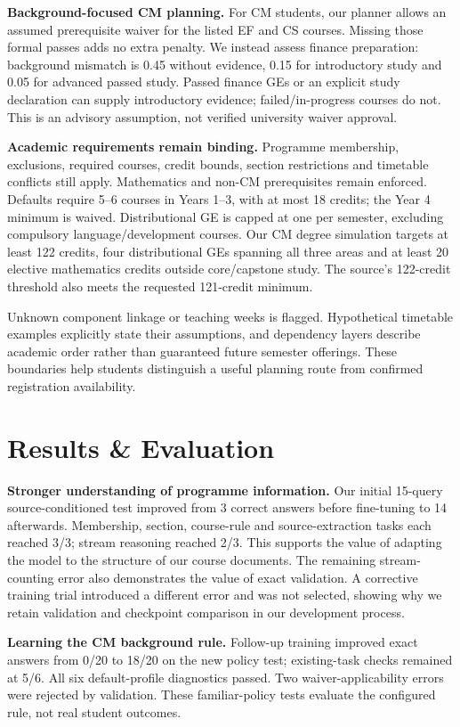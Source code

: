 \documentclass{article}
\begin{document}
\textbf{Background-focused CM planning.} For CM students, our planner allows an assumed prerequisite waiver for the listed EF and CS courses. Missing those formal passes adds no extra penalty. We instead assess finance preparation: background mismatch is 0.45 without evidence, 0.15 for introductory study and 0.05 for advanced passed study. Passed finance GEs or an explicit study declaration can supply introductory evidence; failed/in-progress courses do not. This is an advisory assumption, not verified university waiver approval.

\textbf{Academic requirements remain binding.} Programme membership, exclusions, required courses, credit bounds, section restrictions and timetable conflicts still apply. Mathematics and non-CM prerequisites remain enforced. Defaults require 5--6 courses in Years 1--3, with at most 18 credits; the Year 4 minimum is waived. Distributional GE is capped at one per semester, excluding compulsory language/development courses. Our CM degree simulation targets at least 122 credits, four distributional GEs spanning all three areas and at least 20 elective mathematics credits outside core/capstone study. The source's 122-credit threshold also meets the requested 121-credit minimum.

Unknown component linkage or teaching weeks is flagged. Hypothetical timetable examples explicitly state their assumptions, and dependency layers describe academic order rather than guaranteed future semester offerings. These boundaries help students distinguish a useful planning route from confirmed registration availability.

\newpage
\section{Results \& Evaluation}
\textbf{Stronger understanding of programme information.} Our initial 15-query source-conditioned test improved from 3 correct answers before fine-tuning to 14 afterwards. Membership, section, course-rule and source-extraction tasks each reached 3/3; stream reasoning reached 2/3. This supports the value of adapting the model to the structure of our course documents. The remaining stream-counting error also demonstrates the value of exact validation. A corrective training trial introduced a different error and was not selected, showing why we retain validation and checkpoint comparison in our development process.

\textbf{Learning the CM background rule.} Follow-up training improved exact answers from 0/20 to 18/20 on the new policy test; existing-task checks remained at 5/6. All six default-profile diagnostics passed. Two waiver-applicability errors were rejected by validation. These familiar-policy tests evaluate the configured rule, not real student outcomes.
\end{document}
